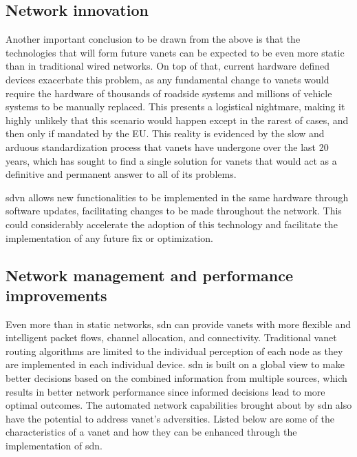\subsection{Network innovation}

Another important conclusion to be drawn from the above is that the technologies that will form future \glspl{vanet} can be expected to be even more static than in traditional wired networks. On top of that, current hardware defined devices exacerbate this problem, as any fundamental change to \glspl{vanet} would require the hardware of thousands of roadside systems and millions of vehicle systems to be manually replaced. This presents a logistical nightmare, making it highly unlikely that this scenario would happen except in the rarest of cases, and then only if mandated by the EU. This reality is evidenced by the slow and arduous standardization process that \glspl{vanet} have undergone over the last 20 years, which has sought to find a single solution for \glspl{vanet} that would act as a definitive and permanent answer to all of its problems. 

\gls{sdvn} allows new functionalities to be implemented in the same hardware through software updates, facilitating changes to be made throughout the network. This could considerably accelerate the adoption of this technology and facilitate the implementation of any future fix or optimization.

\subsection{Network management and performance improvements}

Even more than in static networks, \gls{sdn} can provide \glspl{vanet} with more flexible and intelligent packet flows, channel allocation, and connectivity. Traditional \gls{vanet} routing algorithms are limited to the individual perception of each node as they are implemented in each individual device. \gls{sdn} is built on a global view to make better decisions based on the combined information from multiple sources, which results in better network performance since informed decisions lead to more optimal outcomes. The automated network capabilities brought about by \gls{sdn} also have the potential to address \gls{vanet}'s adversities. Listed below are some of the characteristics of a \gls{vanet} and how they can be enhanced through the implementation of \gls{sdn}.

